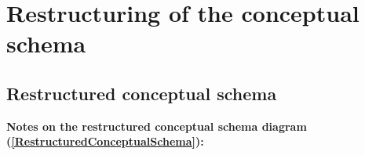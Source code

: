 
\section{Restructuring of the conceptual schema}

\subsection{Restructured conceptual schema}

\textbf{Notes on the restructured conceptual schema diagram (\ref{RestructuredConceptualSchema}):\\}

